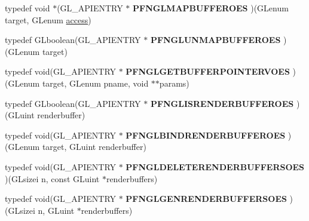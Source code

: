 \begin{DoxyCompactItemize}
\item 
\hypertarget{class_c_p_v_r_tgles_ext_ac591e7d50db4427ec9546245accb8662}{typedef void $\ast$(G\+L\+\_\+\+A\+P\+I\+E\+N\+T\+R\+Y $\ast$ {\bfseries P\+F\+N\+G\+L\+M\+A\+P\+B\+U\+F\+F\+E\+R\+O\+E\+S} )(G\+Lenum target, G\+Lenum \hyperlink{structaccess}{access})}\label{class_c_p_v_r_tgles_ext_ac591e7d50db4427ec9546245accb8662}

\item 
\hypertarget{class_c_p_v_r_tgles_ext_a14af5efe00b0f74f10834449a5f655cc}{typedef G\+Lboolean(G\+L\+\_\+\+A\+P\+I\+E\+N\+T\+R\+Y $\ast$ {\bfseries P\+F\+N\+G\+L\+U\+N\+M\+A\+P\+B\+U\+F\+F\+E\+R\+O\+E\+S} )(G\+Lenum target)}\label{class_c_p_v_r_tgles_ext_a14af5efe00b0f74f10834449a5f655cc}

\item 
\hypertarget{class_c_p_v_r_tgles_ext_a0a7b4be4b369cbc0f585e9384872a7ee}{typedef void(G\+L\+\_\+\+A\+P\+I\+E\+N\+T\+R\+Y $\ast$ {\bfseries P\+F\+N\+G\+L\+G\+E\+T\+B\+U\+F\+F\+E\+R\+P\+O\+I\+N\+T\+E\+R\+V\+O\+E\+S} )(G\+Lenum target, G\+Lenum pname, void $\ast$$\ast$params)}\label{class_c_p_v_r_tgles_ext_a0a7b4be4b369cbc0f585e9384872a7ee}

\item 
\hypertarget{class_c_p_v_r_tgles_ext_a5550e5dadc674d76563ebeacdd0ab256}{typedef G\+Lboolean(G\+L\+\_\+\+A\+P\+I\+E\+N\+T\+R\+Y $\ast$ {\bfseries P\+F\+N\+G\+L\+I\+S\+R\+E\+N\+D\+E\+R\+B\+U\+F\+F\+E\+R\+O\+E\+S} )(G\+Luint renderbuffer)}\label{class_c_p_v_r_tgles_ext_a5550e5dadc674d76563ebeacdd0ab256}

\item 
\hypertarget{class_c_p_v_r_tgles_ext_ab7fc0da0e6f185a546d62599a9f13b4f}{typedef void(G\+L\+\_\+\+A\+P\+I\+E\+N\+T\+R\+Y $\ast$ {\bfseries P\+F\+N\+G\+L\+B\+I\+N\+D\+R\+E\+N\+D\+E\+R\+B\+U\+F\+F\+E\+R\+O\+E\+S} )(G\+Lenum target, G\+Luint renderbuffer)}\label{class_c_p_v_r_tgles_ext_ab7fc0da0e6f185a546d62599a9f13b4f}

\item 
\hypertarget{class_c_p_v_r_tgles_ext_af2d8e706b597ab3685a1e4b6ddbe6ebd}{typedef void(G\+L\+\_\+\+A\+P\+I\+E\+N\+T\+R\+Y $\ast$ {\bfseries P\+F\+N\+G\+L\+D\+E\+L\+E\+T\+E\+R\+E\+N\+D\+E\+R\+B\+U\+F\+F\+E\+R\+S\+O\+E\+S} )(G\+Lsizei n, const G\+Luint $\ast$renderbuffers)}\label{class_c_p_v_r_tgles_ext_af2d8e706b597ab3685a1e4b6ddbe6ebd}

\item 
\hypertarget{class_c_p_v_r_tgles_ext_ab733fe698f2001fa42b630e0b1e6ec6c}{typedef void(G\+L\+\_\+\+A\+P\+I\+E\+N\+T\+R\+Y $\ast$ {\bfseries P\+F\+N\+G\+L\+G\+E\+N\+R\+E\+N\+D\+E\+R\+B\+U\+F\+F\+E\+R\+S\+O\+E\+S} )(G\+Lsizei n, G\+Luint $\ast$renderbuffers)}\label{class_c_p_v_r_tgles_ext_ab733fe698f2001fa42b630e0b1e6ec6c}


\end{DoxyCompactItemize}
